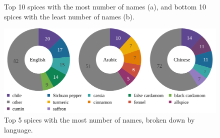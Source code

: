 \begin{figure}[!ht]
	\centering
	\hfill
	\caption[Top and bottom spices by number of names.]{Top 10 spices with the most number of names (a), and bottom 10 spices with the least number of names (b).}
	\label{fig:ids_top_and_bottom_ann}
\end{figure}

\begin{figure}[!ht]
	\centering
	\includegraphics[width=\linewidth]{imgs/plots/ids_tripie.pdf}
	\caption[Top spices by number of names, broken down by language.]{Top 5 spices with the most number of names, broken down by language.}
	\label{fig:ids_tripie}
\end{figure}

